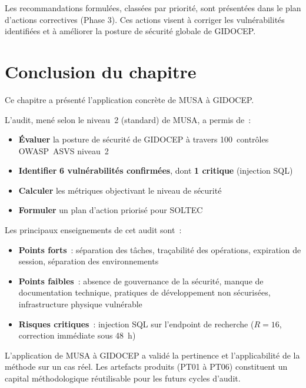 \documentclass[12pt,a4paper,oneside]{report}
\begin{document}
Les recommandations formulées, classées par priorité, sont présentées 
dans le plan d'actions correctives (Phase 3). Ces actions visent à 
corriger les vulnérabilités identifiées et à améliorer la posture de 
sécurité globale de GIDOCEP.
\section*{Conclusion du chapitre}

Ce chapitre a présenté l'application concrète de MUSA à GIDOCEP.

L'audit, mené selon le niveau~2 (standard) de MUSA, a permis de~:
\begin{itemize}[label={\color{gold}}, leftmargin=*]
	\item \textbf{Évaluer} la posture de sécurité de GIDOCEP à travers
	100~contrôles OWASP~ASVS niveau~2
	\item \textbf{Identifier} \textbf{6 vulnérabilités confirmées}, dont
	\textbf{1 critique} (injection SQL)
	\item \textbf{Calculer} les métriques objectivant le niveau de sécurité
	\item \textbf{Formuler} un plan d'action priorisé pour SOLTEC
\end{itemize}

Les principaux enseignements de cet audit sont~:
\begin{itemize}[label={\color{gold}}, leftmargin=*]
	\item \textbf{Points forts}~: séparation des tâches, traçabilité des 
	opérations, expiration de session, séparation des environnements
	
	\item \textbf{Points faibles}~: absence de gouvernance de la sécurité, 
	manque de documentation technique, pratiques de développement 
	non sécurisées, infrastructure physique vulnérable
	
	\item \textbf{Risques critiques}~: injection SQL sur l'endpoint de 
	recherche ($R=16$, correction immédiate sous 48~h)
\end{itemize}

L'application de MUSA à GIDOCEP a validé la pertinence et l'applicabilité
de la méthode sur un cas réel. Les artefacts produits (PT01 à PT06)
constituent un capital méthodologique réutilisable pour les futurs cycles
d'audit.
\end{document}
